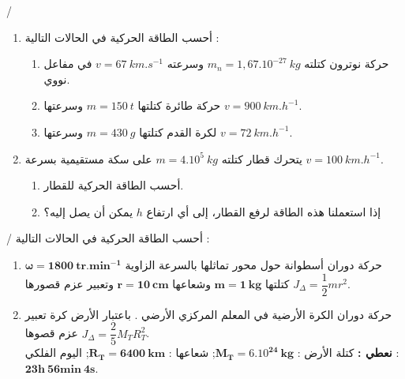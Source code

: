\documentclass[12pt,a4paper]{article}
\begin{document}
					\begin{exercice}{}/
	\begin{enumerate}
	\item 
أحسب الطاقة الحركیة في الحالات التالیة :
	\begin{enumerate}
	\item حركة نوترون كتلته
	$m_n = 1,67.10^{-27}\ kg$
	وسرعته
	$v = 67\ km.s^{-1}$
	في مفاعل نووي.
	\item حركة طائرة كتلتھا
	$m = 150\ t$
	وسرعتھا
$v = 900\ km.h^{-1}$.
\item لكرة القدم كتلتها 
$m = 430\ g$
وسرعتها 
$v=72\ km.h^{-1}$.
\end{enumerate}
\item يتحرك قطار كتلته 
$m=4.10^{5}\ kg$
على سكة مستقيمية بسرعة 
$v = 100\ km.h^{-1}$.
\begin{enumerate}
\item أحسب الطاقة الحركية للقطار.
\item إذا استعملنا هذه الطاقة لرفع القطار، إلى أي ارتفاع 
$h$
يمكن أن يصل إليه؟
\end{enumerate}
\end{enumerate}
	\end{exercice}%
					\begin{exercice}{}/
					أحسب الطاقة الحركیة في الحالات التالیة :
					\begin{enumerate}
					\item   حركة دوران أسطوانة حول محور تماثلھا بالسرعة
	الزاوية 
	$\bm{\omega = 1800\ tr.min^{-1}}$
	كتلتھا
	$\bm{m=1\ kg}$
	وشعاعھا
	$\bm{r=10\ cm}$
	وتعبیر عزم قصورھا
	$J_\Delta =\dfrac{1}{2}mr^2$.
\item حركة دوران الكرة الأرضیة في المعلم المركزي الأرضي . باعتبار الأرض كرة تعبیر عزم
 قصوھا	
$J_\Delta =\dfrac{2}{5}M_TR_T^2$.
	\\\textbf{نعطي :}
	كتلة الأرض :
$\bm{M_T = 6.10^{24}\ kg}$;
	شعاعها :
	$\bm{R_T = 6400\ km}$;
	اليوم الفلكي :
	$\bm{23h\ 56min\ 4s}$.
	\end{enumerate}
	\end{exercice}%
\end{document}
